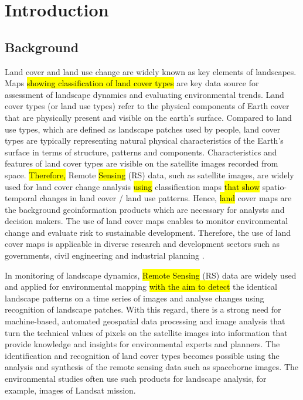 \documentclass[earth,article,submit,pdftex,moreauthors]{Definitions/mdpi}
\begin{document}
\section{Introduction}


\subsection{Background}
{Land cover and land use change are widely known as key elements of landscapes. Maps \hl{showing classification of land cover types} are key data source for assessment of landscape dynamics and evaluating environmental trends. }Land cover types (or land use types) refer to {the} physical{ }components of Earth cover { that are physically present and visible on the earth's surface}. Compared to land use types, which are defined as landscape patches\hl{ }used by{ }people, land cover types are typically representing {natural }physical characteristics of the Earth's surface in terms of structure, patterns and components. {Characteristics and features of land cover types are visible on the satellite images recorded from space}. \hl{Therefore, }Remote \hl{Sensing} (RS) data, such as satellite images, are widely used for land cover change analysis \hl{using} classification maps \hl{that show} spatio-temporal changes in land cover / land use patterns. Hence, \hl{land }cover maps are the background geoinformation products which are necessary for analysts and decision makers. The use of land cover maps enables to monitor environmental change and evaluate risk to sustainable development. Therefore, the use of land cover maps is applicable in diverse research and development sectors such as governments, civil engineering and industrial planning \cite{9553499}.

{In monitoring of landscape dynamics, \hl{Remote Sensing} (RS) data are widely used and applied for environmental mapping \hl{with the aim to detect }the identical landscape patterns on a time series of images and\hl{ }analyse changes using recognition of landscape patches. With this regard, there is a strong need for machine-based, automated geospatial data processing and image analysis that turn the technical values of pixels on the satellite images into information that provide knowledge and insights for environmental experts and planners. The} identification{ and recognition of land cover types becomes }possible using {the }analysis and synthesis of {the }remote sensing data such as spaceborne images. {The} environmental studies often use {such} products{ for landscape analysis, for example, images }of Landsat mission. 
\end{document}
